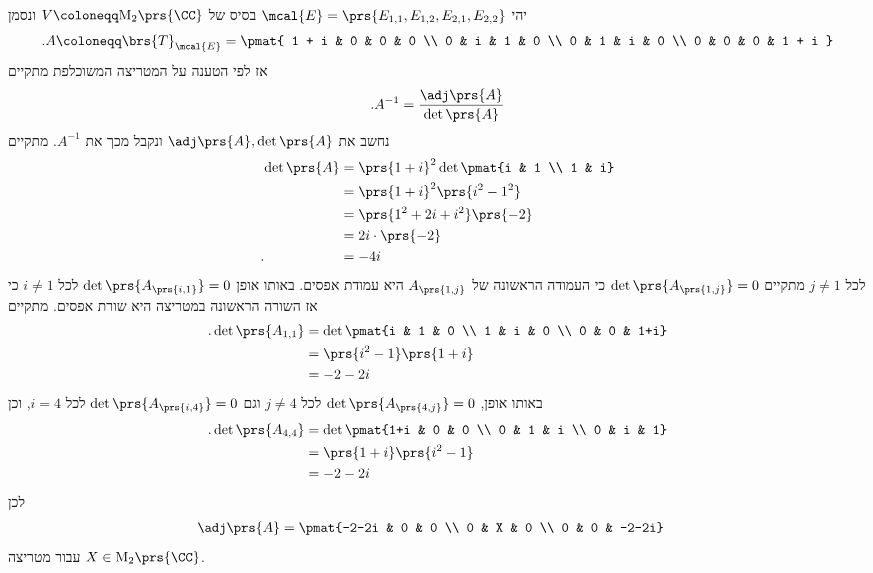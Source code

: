 \documentclass[a4paper,10pt,twoside,openany]{book}
\renewcommand{\Mat}{\mathrm{M}}
\begin{document}
\begin{solution}
יהי
$\mcal{E} = \prs{E_{1,1}, E_{1,2}, E_{2,1}, E_{2,2}}$
בסיס של
$V \coloneqq \Mat_2\prs{\CC}$
ונסמן
\begin{align*}
\text{.} A \coloneqq \brs{T}_{\mcal{E}} =
\pmat{
	1 + i & 0 & 0 & 0
	\\
	0 & i & 1 & 0
	\\
	0 & 1 & i & 0 \\
	0 & 0 & 0 & 1 + i
}
\end{align*}
אז לפי הטענה על המטריצה המשוכלפת מתקיים
\begin{align*}
\text{.} A^{-1} = \frac{\adj\prs{A}}{\det\prs{A}}
\end{align*}
נחשב את
$\adj\prs{A}, \det\prs{A}$
ונקבל מכך את
$A^{-1}$.
מתקיים
\begin{align*}
\det\prs{A} &= \prs{1+i}^2 \det\pmat{i & 1 \\ 1 & i}
\\&= \prs{1+i}^2 \prs{i^2 - 1^2}
\\&= \prs{1^2 + 2i + i^2} \prs{-2}
\\&= 2i \cdot \prs{-2}
\\ \text{.} \phantom{\det\prs{A}} &= -4i
\end{align*}
לכל
$j \neq 1$
מתקיים
$\det\prs{A_{\prs{1,j}}} = 0$
כי העמודה הראשונה של
$A_{\prs{1,j}}$
היא עמודת אפסים.
באותו אופן
$\det\prs{A_{\prs{i,1}}} = 0$
לכל
$i \neq 1$
כי אז השורה הראשונה במטריצה היא שורת אפסים.
מתקיים
\begin{align*}
\text{.} \det\prs{A_{1,1}} &= \det\pmat{i & 1 & 0 \\ 1 & i & 0 \\ 0 & 0 & 1+i}
\\&= \prs{i^2 - 1} \prs{1+i}
\\&= -2 - 2i
\end{align*}
באותו אופן,
$\det\prs{A_{\prs{4,j}}} = 0$
לכל
$j \neq 4$
וגם
$\det\prs{A_{\prs{i,4}}} = 0$
לכל
$i = 4$,
וכן
\begin{align*}
\text{.} \det\prs{A_{4,4}} &= \det\pmat{1+i & 0 & 0 \\ 0 & 1 & i \\ 0 & i & 1}
\\&= \prs{1+i} \prs{i^2 - 1}
\\&= -2 - 2i
\end{align*}
לכן
\begin{align*}
\adj\prs{A} &= \pmat{-2-2i & 0 & 0 \\ 0 & X & 0 \\ 0 & 0 & -2-2i}
\end{align*}
עבור מטריצה
$X \in \Mat_2\prs{\CC}$.


\end{solution}
\end{document}
